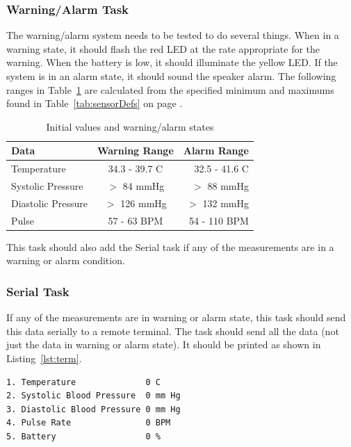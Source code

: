 \documentclass[12pt]{article} %
\begin{document}
    \subsubsection{Warning/Alarm Task} 
    The warning/alarm system needs to be tested to do several things. When in a
    warning state, it should flash the red LED at the rate appropriate for the
    warning. When the battery is low, it should illuminate the yellow LED. If the
    system is in an alarm state, it should sound the speaker alarm. The following
    ranges in Table~\ref{tab:ranges} are calculated from the specified minimum and
    maximums found in Table~\ref{tab:sensorDefs} on page \pageref{tab:sensorDefs}.
    \begin{table}[h]
      \centering
      \begin{tabular}{lcr} 
	\toprule
	Data & Warning Range & Alarm Range \\
	\midrule
	Temperature & 34.3 - 39.7 C & 32.5 - 41.6 C\\
	Systolic Pressure & $>$ 84 mmHg & $>$ 88 mmHg\\
	Diastolic Pressure & $>$ 126 mmHg & $>$ 132 mmHg\\
	Pulse & 57 - 63 BPM & 54 - 110 BPM \\
	\bottomrule
      \end{tabular}
      \caption{Initial values and warning/alarm states}
      \label{tab:ranges}
    \end{table}

    This task should also add the Serial task if any of the measurements are in
    a warning or alarm condition.

    \subsubsection{Serial Task}
    If any of the measurements are in warning or alarm state, this task should
    send this data serially to a remote terminal.  The task should send all the
    data (not just the data in warning or alarm state).  It should be printed as
    shown in Listing~\ref{lst:term}.\\

\begin{lstlisting}[caption=Remote Terminal Output, captionpos=b, label=lst:term]
1. Temperature              0 C
2. Systolic Blood Pressure  0 mm Hg
3. Diastolic Blood Pressure 0 mm Hg
4. Pulse Rate               0 BPM
5. Battery                  0 % 
\end{lstlisting}
\end{document}
